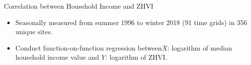 \documentclass[final]{beamer}
\newlength{\colwidth}
\begin{document}
\begin{frame}[t]
\begin{columns}[t]
\begin{column}{\colwidth}






  \vspace{-1em}
  \begin{block}{Correlation between Household Income and ZHVI}
\begin{itemize}
\item Seasonally measured from summer 1996 to winter 2018 (91 time grids) in 356 unique sites.
\item Conduct function-on-function regression between$X$: logarithm of median household income value and $Y$: logarithm of ZHVI.
\end{itemize}


\end{block}
\end{column}
\end{columns}
\end{frame}
\end{document}
